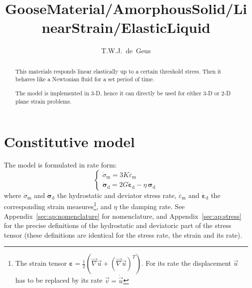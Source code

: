 \documentclass[times,namecite]{goose-article}
\title{%
  GooseMaterial/AmorphousSolid/LinearStrain/ElasticLiquid
}
\author{T.W.J.~de~Geus}
\begin{document}
\maketitle

\begin{abstract}
This materials responds linear elastically up to a certain threshold stress. Then it behaves like a Newtonian fluid for a set period of time.

The model is implemented in 3-D, hence it can directly be used for either 3-D or 2-D plane strain problems.
\end{abstract}


\setcounter{tocdepth}{2}
\tableofcontents

\vfill\newpage
\section{Constitutive model}

The model is formulated in rate form:
\begin{equation}
\begin{cases}
\dot{\sigma}_\mathrm{m} = 3 K \dot{\varepsilon}_\mathrm{m} \\
\dot{\bm{\sigma}}_\mathrm{d} = 2 G \dot{\bm{\varepsilon}}_\mathrm{d} - \eta \, \bm{\sigma}_\mathrm{d}
\end{cases}
\end{equation}
where $\dot{\sigma}_\mathrm{m}$ and $\dot{\bm{\sigma}}_\mathrm{d}$ the hydrostatic and deviator stress rate, $\dot{\varepsilon}_\mathrm{m}$ and $\dot{\bm{\varepsilon}}_\mathrm{d}$ the corresponding strain measures\footnote{The strain tensor $\bm{\varepsilon} = \tfrac{1}{2} \left( \vec{\nabla} \vec{u} + (\vec{\nabla} \vec{u})^T \right)$. For its rate the displacement $\vec{u}$ has to be replaced by its rate $\vec{v} = \dot{\vec{u}}$}, and $\eta$ the damping rate. See Appendix~\ref{sec:ap:nomenclature} for nomenclature, and Appendix~\ref{sec:ap:stress} for the precise definitions of the hydrostatic and deviatoric part of the stress tensor (these definitions are identical for the stress rate, the strain and its rate).
\end{document}
